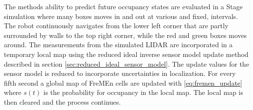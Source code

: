 The methods ability to predict future occupancy states are evaluated in a Stage simulation where many boxes moves in and out at various and fixed, intervals. 
The robot continuously navigates from the lower left corner that are partly surrounded by walls to the top right corner, while the red and green boxes moves around.
The measurements from the simulated LIDAR are incorporated in a temporary local map using the reduced ideal inverse sensor model update method described in section \ref{sec:reduced_ideal_sensor_model}. 
The update values for the sensor model is reduced to incorporate uncertainties in localization.
For every fifth second a global map of FreMEn cells are updated with \ref{eq:fremen_update} where $s(t)$ is the probability for occupancy in the local map. 
The local map is then cleared and the process continues.

